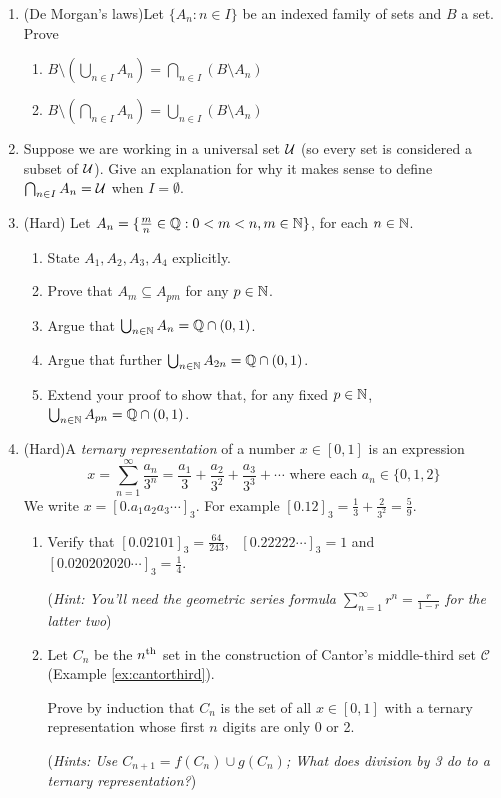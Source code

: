 \begin{exercises}{}{}
\begin{enumerate}
		
		\item (De Morgan's laws)\lstsp Let $\{A_n:n\in I\}$ be an indexed family of sets and $B$ a set. Prove
		\begin{enumerate}
	    \item $B\setminus \left(\bigcup_{n\in I} A_n\right) = \bigcap_{n\in I} (B\setminus A_n)$
	    \item $B\setminus \left(\bigcap_{n\in I} A_n\right) = \bigcup_{n\in I}(B\setminus A_n)$
		\end{enumerate}
		
		
		\item Suppose we are working in a universal set $\mathcal{U}$ (so every set is considered a subset of $\mathcal{U}$). Give an explanation for why it makes sense to define $\bigcap_{n \in I} A_n = \mathcal{U}$ when $I = \emptyset$.
		
		\item (Hard) Let $A_n=\{\frac mn\in\mathbb{Q}:0<m<n, m\in \mathbb{N}\}$, for each $n\in\mathbb{N}$.
		\begin{enumerate}
			\item State $A_1,A_2,A_3,A_4$ explicitly.
			\item Prove that $A_m\subseteq A_{pm}$ for any $p\in\mathbb{N}$.
			\item Argue that $\bigcup_{n\in\mathbb{N}}A_n=\mathbb{Q}\cap (0,1)$.
			\item Argue that further $\bigcup_{n\in\mathbb{N}}A_{2n}=\mathbb{Q}\cap (0,1)$.
			\item Extend your proof to show that, for any fixed $p\in\mathbb{N}$, $\bigcup_{n\in\mathbb{N}}A_{pn}=\mathbb{Q}\cap (0,1)$.
		\end{enumerate}
		
		\goodbreak
		
			
		\item\label{exs:cantorset} (Hard)\lstsp A \emph{ternary representation}\footnotemark{} of a number $x\in[0,1]$ is an expression
		\[
			x=\sum\limits_{n=1}^\infty \frac{a_n}{3^n}=\frac{a_1}{3}+\frac{a_2}{3^2}+\frac{a_3}{3^3}+\cdots \text{ where each }a_n\in\{0,1,2\}
		\]
		We write $x=[0.a_1a_2a_3\cdots]_3$. For example $[0.12]_3=\frac 13+\frac 2{3^2}=\frac 59$.
		\begin{enumerate}
		  \item Verify that $[0.02101]_3=\frac{64}{243}$, \ $[0.22222\cdots]_3=1$ and $[0.020202020\cdots]_3=\frac 14$.\par
		  (\emph{Hint: You'll need the geometric series formula $\sum_{n=1}^\infty r^n=\frac r{1-r}$ for the latter two})
		  
		  \item Let $C_n$ be the $n\textsuperscript{th}$ set in the construction of Cantor's middle-third set $\mathcal C$ (Example \ref{ex:cantorthird}).\par
		  Prove by induction that $C_n$ is the set of all $x\in[0,1]$ with a ternary representation whose first $n$ digits are only 0 or 2.\par
		  (\emph{Hints: Use $C_{n+1}=f(C_n)\cup g(C_n)$; What does division by 3 do to a ternary representation?})
		  	  

\end{enumerate}
\end{enumerate}
\end{exercises}
